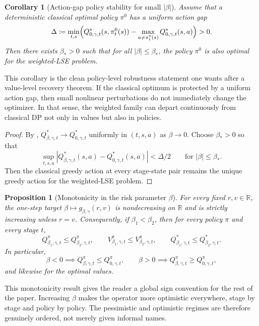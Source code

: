 \documentclass{article}
\newtheorem{proposition}[proposition]{Proposition}
\newtheorem{corollary}[corollary]{Corollary}
\theoremstyle{remark}
\newcommand{\R}{\mathbb{R}}
\newcommand{\defeq}{\coloneqq}
\newcommand{\gbg}{g_{\beta,\gamma}}
\begin{document}
\begin{corollary}[Action-gap policy stability for small $|\beta|$]
\label{cor:small-beta-policy-stability}
Assume that a deterministic classical optimal policy $\pi^0$ has a uniform action gap
\[
\Delta \defeq \min_{t,s}\Bigl(Q^*_{0,\gamma,t}(s,\pi_t^0(s)) - \max_{a\neq \pi_t^0(s)}Q^*_{0,\gamma,t}(s,a)\Bigr) > 0.
\]
Then there exists $\beta_*>0$ such that for all $|\beta|\le \beta_*$, the policy $\pi^0$ is also optimal for the weighted-LSE problem.
\end{corollary}

This corollary is the clean policy-level robustness statement one wants after a value-level recovery theorem.
If the classical optimum is protected by a uniform action gap, then small nonlinear perturbations do not immediately change the optimizer.
In that sense, the weighted family can depart continuously from classical DP not only in values but also in policies.

\begin{proof}
By , $Q^*_{\beta,\gamma,t}\to Q^*_{0,\gamma,t}$ uniformly in $(t,s,a)$ as $\beta\to 0$.
Choose $\beta_*>0$ so that
\[
\sup_{t,s,a}|Q^*_{\beta,\gamma,t}(s,a)-Q^*_{0,\gamma,t}(s,a)|<\Delta/2
\qquad \text{for } |\beta|\le \beta_*.
\]
Then the classical greedy action at every stage-state pair remains the unique greedy action for the weighted-LSE problem.
\end{proof}

\begin{proposition}[Monotonicity in the risk parameter $\beta$]
\label{prop:beta-monotone}
For every fixed $r,v\in\R$, the one-step target $\beta\mapsto \gbg(r,v)$ is nondecreasing on $\R$ and is strictly increasing unless $r=v$.
Consequently, if $\beta_1<\beta_2$, then for every policy $\pi$ and every stage $t$,
\[
Q_{\beta_1,\gamma,t}^\pi \le Q_{\beta_2,\gamma,t}^\pi,
\qquad
V_{\beta_1,\gamma,t}^\pi \le V_{\beta_2,\gamma,t}^\pi,
\qquad
Q_{\beta_1,\gamma,t}^* \le Q_{\beta_2,\gamma,t}^*.
\]
In particular,
\[
\beta<0 \implies Q_{\beta,\gamma,t}^\pi \le Q_{0,\gamma,t}^\pi,
\qquad
\beta>0 \implies Q_{\beta,\gamma,t}^\pi \ge Q_{0,\gamma,t}^\pi,
\]
and likewise for the optimal values.
\end{proposition}

This monotonicity result gives the reader a global sign convention for the rest of the paper.
Increasing $\beta$ makes the operator more optimistic everywhere, stage by stage and policy by policy.
The pessimistic and optimistic regimes are therefore genuinely ordered, not merely given informal names.
\end{document}
